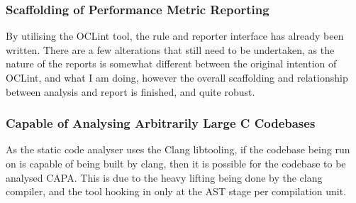 \subsubsection{Scaffolding of Performance Metric Reporting}
By utilising the OCLint tool, the rule and reporter interface has already been written. There are a few alterations that still need to be undertaken, as the nature of the reports is somewhat different between the original intention of OCLint, and what I am doing, however the overall scaffolding and relationship between analysis and report is finished, and quite robust.

\subsubsection{Capable of Analysing Arbitrarily Large C Codebases}
As the static code analyser uses the Clang libtooling, if the codebase being run on is capable of being built by clang, then it is possible for the codebase to be analysed CAPA. This is due to the heavy lifting being done by the clang compiler, and the tool hooking in only at the AST stage per compilation unit.

